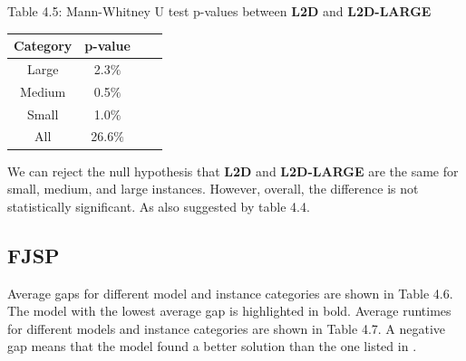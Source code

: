 \begin{table}
    Table 4.5: Mann-Whitney U test p-values between \textbf{L2D} and \textbf{L2D-LARGE}\\
    \begin{tabular}{cccc}
        \toprule
        Category & p-value \\
        \midrule
        Large & 2.3$\%$ \\
        Medium & 0.5$\%$ \\
        Small & 1.0$\%$ \\
        All & 26.6$\%$ \\
        \bottomrule
    \end{tabular}
\end{table}

We can reject the null hypothesis that \textbf{L2D} and \textbf{L2D-LARGE} are the same for small, medium, and large instances. However, overall, the difference is not statistically significant. As also suggested by table 4.4.

\subsection{FJSP} \label{results_fjsp}

Average gaps for different model and instance categories are shown in Table 4.6. The model with the lowest average gap is highlighted in bold. Average runtimes for different models and instance categories are shown in Table 4.7. A negative gap means that the model found a better solution than the one listed in \cite{fjsp_benchmarks}.

